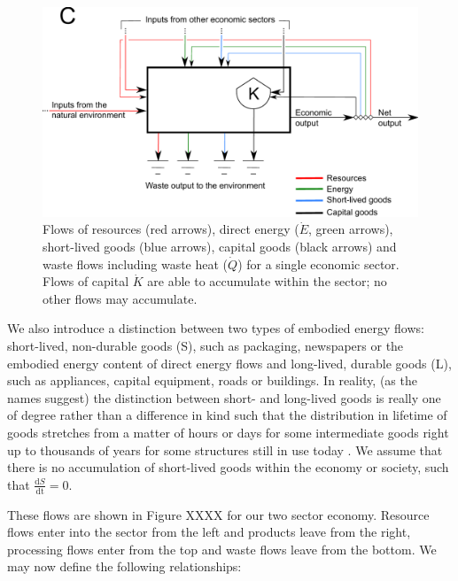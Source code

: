 \begin{figure}[h!]
\includegraphics[width=1.0\linewidth]{Chapter_Example_D/images/Basic_unit_C.pdf}
\caption{Flows of resources (red arrows), direct energy ($\dot{E}$, green arrows), short-lived goods (blue arrows), capital goods (black arrows) and waste flows including waste heat ($\dot{Q}$) for a single economic sector. Flows of capital $\dot{K}$ are able to accumulate within the sector; no other flows may accumulate.}
\label{fig:basic_unit_C}
\end{figure}

We also introduce a distinction between two types of embodied energy flows: short-lived, non-durable goods (S), such as packaging, newspapers or the embodied energy content of direct energy flows and long-lived, durable goods (L), such as appliances, capital equipment, roads or buildings. In reality, (as the names suggest) the distinction between short- and long-lived goods is really one of degree rather than a difference in kind such that the distribution in lifetime of goods stretches from a matter of hours or days for some intermediate goods right up to thousands of years for some structures still in use today \cite{Leask2012}. We assume that there is no accumulation of short-lived goods within the economy or society, such that $\frac{\textrm{d}S}{\textrm{dt}} = 0$.  

These flows are shown in Figure XXXX for our two sector economy. Resource flows enter into the sector from the left and products leave from the right, processing flows enter from the top and waste flows leave from the bottom. We may now define the following relationships:

